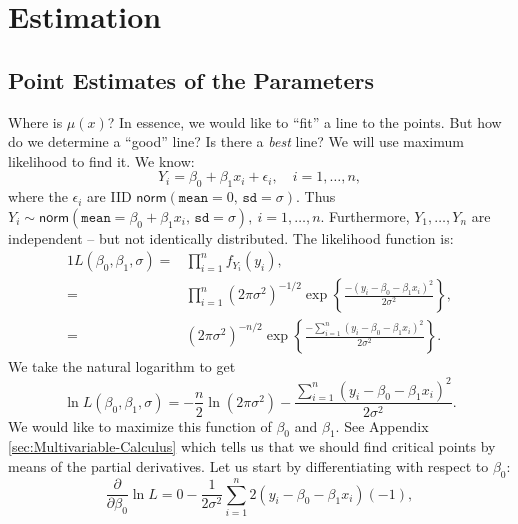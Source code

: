 \documentclass[captions=tableheading]{scrbook}
\begin{document}
\section{Estimation}
\label{sec-11-2}

\label{sec:SLR-Estimation}
\subsection{Point Estimates of the Parameters}
\label{sec-11-2-1}

\label{sub:point-estimate-mle-slr}

Where is \( \mu(x) \)? In essence, we would like to ``fit'' a line to the points. But how do we determine a ``good'' line? Is there a \emph{best} line? We will use maximum likelihood to find it. We know:
\begin{equation}
Y_{i} = \beta_{0} + \beta_{1}x_{i} + \epsilon_{i},\quad i=1,\ldots,n,
\end{equation}
where the \( \epsilon_{i} \) are IID \(\mathsf{norm}(\mathtt{mean}=0,\,\mathtt{sd}=\sigma) \). Thus \( Y_{i}\sim\mathsf{norm}(\mathtt{mean}=\beta_{0}+\beta_{1}x_{i},\,\mathtt{sd}=\sigma),\ i=1,\ldots,n \). Furthermore, \( Y_{1},\ldots,Y_{n} \) are independent -- but not identically distributed. The likelihood function is:
\begin{alignat}{1}
L(\beta_{0},\beta_{1},\sigma)= & \prod_{i=1}^{n}f_{Y_{i}}(y_{i}),\\
= & \prod_{i=1}^{n}(2\pi\sigma^{2})^{-1/2}\exp\left\{ \frac{-(y_{i}-\beta_{0}-\beta_{1}x_{i})^{2}}{2\sigma^{2}}\right\} ,\\
= & (2\pi\sigma^{2})^{-n/2}\exp\left\{ \frac{-\sum_{i=1}^{n}(y_{i}-\beta_{0}-\beta_{1}x_{i})^{2}}{2\sigma^{2}}\right\} .
\end{alignat}
We take the natural logarithm to get
\begin{equation}
\ln L(\beta_{0},\beta_{1},\sigma)=-\frac{n}{2}\ln(2\pi\sigma^{2})-\frac{\sum_{i=1}^{n}(y_{i}-\beta_{0}-\beta_{1}x_{i})^{2}}{2\sigma^{2}}.\label{eq:regML-lnL}
\end{equation}
 We would like to maximize this function of \( \beta_{0} \) and \( \beta_{1} \). See Appendix \ref{sec:Multivariable-Calculus} which tells us that we should find critical points by means of the partial derivatives. Let us start by differentiating with respect to \( \beta_{0} \):
\begin{equation}
\frac{\partial}{\partial\beta_{0}}\ln L=0-\frac{1}{2\sigma^{2}}\sum_{i=1}^{n}2(y_{i}-\beta_{0}-\beta_{1}x_{i})(-1),
\end{equation}
\end{document}

